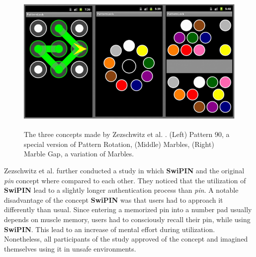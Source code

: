 \begin{figure}[t!]
\centering
\includegraphics[width=13cm, height=7cm]{Chapters/graphics/graphic.PNG}
\caption{The three concepts made by Zezschwitz et al. \cite{Marbles}. (Left) Pattern 90, a special version of Pattern Rotation, (Middle) Marbles, (Right) Marble Gap, a variation of Marbles.}
\label{fig:marbles}
\end{figure}

Zezschwitz et al. \cite{Swipin} further conducted a study in which \textbf{SwiPIN} and the original \textit{pin} concept where compared to each other. They noticed that the utilization of \textbf{SwiPIN} lead to a slightly longer authentication process than \textit{pin}. A notable disadvantage of the concept \textbf{SwiPIN} was that users had to approach it differently than usual. Since entering a memorized pin into a number pad usually depends on muscle memory, users had to consciously recall their pin, while using \textbf{SwiPIN}. This lead to an increase of mental effort during utilization. Nonetheless, all participants of the study approved of the concept and imagined themselves using it in unsafe environments. \\

